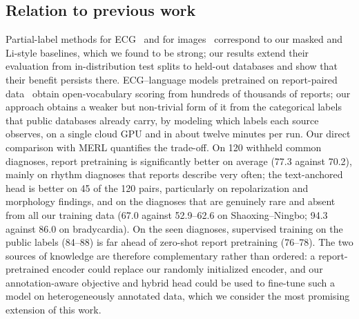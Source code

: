 \subsection{Relation to previous work}\label{sec:disc_related}
Partial-label methods for ECG~\cite{li2024} and for images~\cite{durand2019,benbaruch2022} correspond to our masked and Li-style baselines, which we found to be strong; our results extend their evaluation from in-distribution test splits to held-out databases and show that their benefit persists there. ECG--language models pretrained on report-paired data~\cite{merl2024,suprime2025,melp2025} obtain open-vocabulary scoring from hundreds of thousands of reports; our approach obtains a weaker but non-trivial form of it from the categorical labels that public databases already carry, by modeling which labels each source observes, on a single cloud GPU and in about twelve minutes per run. Our direct comparison with MERL quantifies the trade-off. On 120 withheld common diagnoses, report pretraining is significantly better on average (77.3 against 70.2), mainly on rhythm diagnoses that reports describe very often; the text-anchored head is better on 45 of the 120 pairs, particularly on repolarization and morphology findings, and on the diagnoses that are genuinely rare and absent from all our training data (67.0 against 52.9--62.6 on Shaoxing--Ningbo; 94.3 against 86.0 on bradycardia). On the seen diagnoses, supervised training on the public labels (84--88) is far ahead of zero-shot report pretraining (76--78). The two sources of knowledge are therefore complementary rather than ordered: a report-pretrained encoder could replace our randomly initialized encoder, and our annotation-aware objective and hybrid head could be used to fine-tune such a model on heterogeneously annotated data, which we consider the most promising extension of this work.

